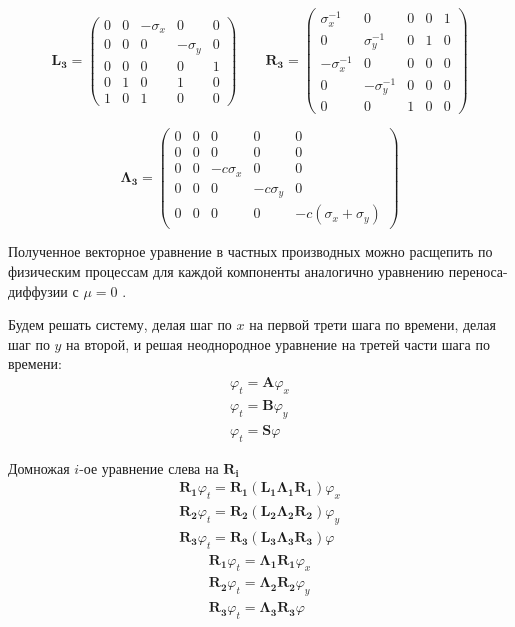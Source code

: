\begin{equation*}
    \bm{L_3} = \begin{pmatrix}
        0 & 0 & -\sigma_x & 0 & 0 \\
        0 & 0 & 0 & -\sigma_y & 0 \\
        0 & 0 & 0 & 0 & 1 \\
        0 & 1 & 0 & 1 & 0 \\
        1 & 0 & 1 & 0 & 0
    \end{pmatrix} \qquad
    \bm{R_3} = \begin{pmatrix}
        \sigma_x^{-1} & 0 & 0 & 0 & 1 \\
        0 & \sigma_y^{-1} & 0 & 1 & 0 \\
        -\sigma_x^{-1} & 0 & 0 & 0 & 0 \\
        0 & -\sigma_y^{-1} & 0 & 0 & 0 \\
        0 & 0 & 1 & 0 & 0
    \end{pmatrix}
\end{equation*}

\begin{equation*}
    \bm{\Lambda_3} = \begin{pmatrix}
        0 & 0 & 0 & 0 & 0 \\
        0 & 0 & 0 & 0 & 0 \\
        0 & 0 & -c \sigma_x & 0 & 0 \\
        0 & 0 & 0 & -c \sigma_y & 0 \\
        0 & 0 & 0 & 0 & -c (\sigma_x + \sigma_y)
    \end{pmatrix}
\end{equation*}

Полученное векторное уравнение в частных производных можно расщепить по физическим процессам для каждой компоненты аналогично уравнению переноса-диффузии с $\mu = 0$ \cite{marchuk_rasshep}.

Будем решать систему, делая шаг по $x$ на первой трети шага по времени, делая шаг по $y$ на второй, и решая неоднородное уравнение на третей части шага по времени:
\begin{gather*} 
	\label{eq:pml_eq_split_1} \varphi_t = \bm{A} \varphi_x \\
	\label{eq:pml_eq_split_2} \varphi_t = \bm{B} \varphi_y \\
	\label{eq:pml_eq_split_3} \varphi_t = \bm{S} \varphi
\end{gather*}

Домножая $i$-ое уравнение слева на $\bm{R_i}$
\begin{gather*} 
    \bm{R_1} \varphi_t = \bm{R_1}\left(\bm{L_1 \Lambda_1 R_1}\right) \varphi_x \\
	\bm{R_2} \varphi_t = \bm{R_2}\left(\bm{L_2 \Lambda_2 R_2}\right) \varphi_y \\
	\bm{R_3} \varphi_t = \bm{R_3}\left(\bm{L_3 \Lambda_3 R_3}\right) \varphi
\end{gather*}
\begin{gather*} 
    \bm{R_1} \varphi_t = \bm{\Lambda_1 R_1} \varphi_x \\
	\bm{R_2} \varphi_t = \bm{\Lambda_2 R_2} \varphi_y \\
	\bm{R_3} \varphi_t = \bm{\Lambda_3 R_3} \varphi
\end{gather*}
    
